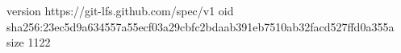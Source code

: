 version https://git-lfs.github.com/spec/v1
oid sha256:23ec5d9a634557a55ecf03a29cbfc2bdaab391eb7510ab32facd527ffd0a355a
size 1122
